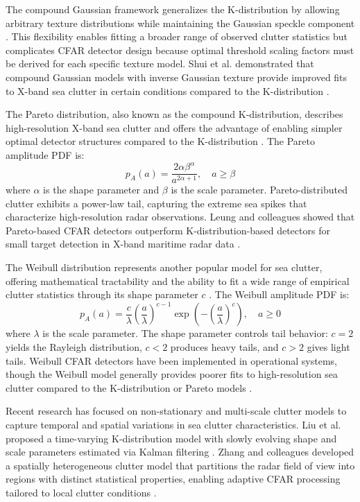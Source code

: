 The compound Gaussian framework generalizes the K-distribution by allowing arbitrary texture distributions while maintaining the Gaussian speckle component \cite{Gao2020}. This flexibility enables fitting a broader range of observed clutter statistics but complicates CFAR detector design because optimal threshold scaling factors must be derived for each specific texture model. Shui et al. demonstrated that compound Gaussian models with inverse Gaussian texture provide improved fits to X-band sea clutter in certain conditions compared to the K-distribution \cite{Shui2019}.

The Pareto distribution, also known as the compound K-distribution, describes high-resolution X-band sea clutter and offers the advantage of enabling simpler optimal detector structures compared to the K-distribution \cite{Farshchian2010}. The Pareto amplitude PDF is:
\begin{equation}
p_A(a) = \frac{2\alpha \beta^\alpha}{a^{2\alpha+1}}, \quad a \geq \beta
\end{equation}
where $\alpha$ is the shape parameter and $\beta$ is the scale parameter. Pareto-distributed clutter exhibits a power-law tail, capturing the extreme sea spikes that characterize high-resolution radar observations. Leung and colleagues showed that Pareto-based CFAR detectors outperform K-distribution-based detectors for small target detection in X-band maritime radar data \cite{Leung2022}.

The Weibull distribution represents another popular model for sea clutter, offering mathematical tractability and the ability to fit a wide range of empirical clutter statistics through its shape parameter $c$ \cite{Wang2024}. The Weibull amplitude PDF is:
\begin{equation}
p_A(a) = \frac{c}{\lambda} \left( \frac{a}{\lambda} \right)^{c-1} \exp \left( -\left( \frac{a}{\lambda} \right)^c \right), \quad a \geq 0
\end{equation}
where $\lambda$ is the scale parameter. The shape parameter controls tail behavior: $c = 2$ yields the Rayleigh distribution, $c < 2$ produces heavy tails, and $c > 2$ gives light tails. Weibull CFAR detectors have been implemented in operational systems, though the Weibull model generally provides poorer fits to high-resolution sea clutter compared to the K-distribution or Pareto models \cite{Mezache2015}.

Recent research has focused on non-stationary and multi-scale clutter models to capture temporal and spatial variations in sea clutter characteristics. Liu et al. proposed a time-varying K-distribution model with slowly evolving shape and scale parameters estimated via Kalman filtering \cite{Liu2023}. Zhang and colleagues developed a spatially heterogeneous clutter model that partitions the radar field of view into regions with distinct statistical properties, enabling adaptive CFAR processing tailored to local clutter conditions \cite{Zhang2023}.

